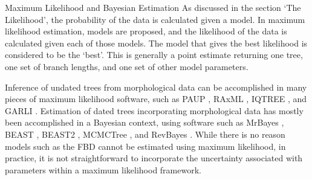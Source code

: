 \begin{boxedtext}{Maximum Likelihood and Bayesian Estimation}
As discussed in the section `The Likelihood', the probability of the data is calculated given a model. 
In maximum likelihood estimation, models are proposed, and the likelihood of the data is calculated given each of those models.
The model that gives the best likelihood is considered to be the `best'.
This is generally a point estimate returning one tree, one set of branch lengths, and one set of other model parameters.

Inference of undated trees from morphological data can be accomplished in many pieces of maximum likelihood software, such as PAUP \citep{Swofford2003}, RAxML \citep{Stamatakis2014}, IQTREE \citep{IQtree}, and GARLI \cite{zwickl2006}.
Estimation of dated trees incorporating morphological data has mostly been accomplished in a Bayesian context, using software such as MrBayes \cite{Huelsenbeck2002, Ronquist2003}, BEAST \citep{BEAST}, BEAST2 \citep{BEAST2} , MCMCTree \citep{MCMCtree}, and RevBayes \citep{Hoehna2014b, Hoehna2016b}.
While there is no reason models such as the FBD cannot be estimated using maximum likelihood, in practice, it is not straightforward to incorporate the uncertainty associated with parameters within a maximum likelihood framework.
\end{boxedtext}
